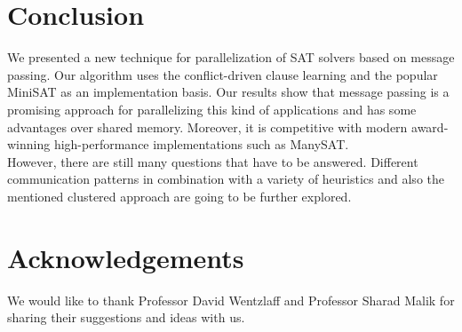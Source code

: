 \documentclass[letterpaper, compsoc, conference]{IEEEtran}
\begin{document}
\section{Conclusion}
We presented a new technique for parallelization of SAT solvers based
on message passing. Our algorithm uses the conflict-driven clause learning 
and the popular MiniSAT as an implementation basis. Our results show that 
message passing is a promising approach for parallelizing this kind of 
applications and has some advantages over shared memory. Moreover, it is
competitive with modern award-winning high-performance implementations such as ManySAT. \\
\indent However, there are still many questions that have to be answered. Different 
communication patterns in combination with a variety of heuristics and also the mentioned clustered approach are going to be further explored.

\section*{Acknowledgements}

We would like to thank Professor David Wentzlaff and Professor Sharad Malik for
sharing their suggestions and ideas with us.



\end{document}
